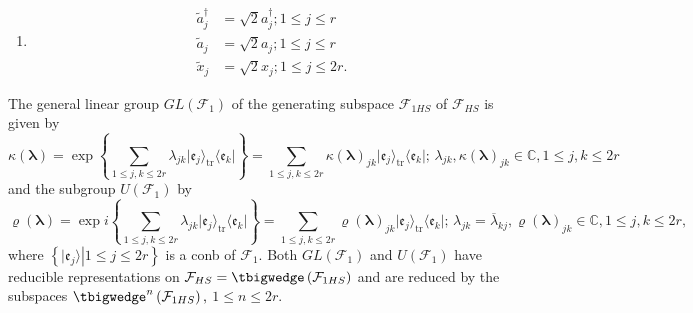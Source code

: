 \documentclass[aps, preprint]{revtex4}
\begin{document}
\begin{enumerate}
\item
\begin{align}\widetilde{a}_{j}^{ \dag } &  =\sqrt{2} a_{j}^{ \dag } ;1 \leq j \leq r \\
\widetilde{a}_{j} &  =\sqrt{2} a_{j} ;1 \leq j \leq r \\
\widetilde{x}_{j} &  =\sqrt{2} x_{j} ;1 \leq j \leq 2 r\text{.}\end{align}\end{enumerate}


The general linear group $G L \left (\mathcal{F}_{1}\right )$ of the generating subspace $\mathcal{F}_{1 H S}$ of $\mathcal{F}_{H S}$ is given by
\begin{equation}\kappa  \left (\mathbf{\lambda }\right ) =\exp  \left \{\sum _{1 \leq j ,k \leq 2 r}\lambda _{j k} \vert \mathfrak{e}_{j} \rangle _{\ensuremath{\operatorname*{tr}}} \langle \mathfrak{e}_{k}\vert \right \} =\sum _{1 \leq j ,k \leq 2 r}\kappa  \left (\mathbf{\lambda }\right )_{j k} \vert \mathfrak{e}_{j} \rangle _{\ensuremath{\operatorname*{tr}}} \langle \mathfrak{e}_{k}\vert  ;\,\lambda _{j k} ,\kappa  \left (\mathbf{\lambda }\right )_{j k} \in \mathbb{C} ,1 \leq j ,k \leq 2 r
\end{equation}and the subgroup $U \left (\mathcal{F}_{1}\right )$ by
\begin{equation}\varrho  \left (\mathbf{\lambda }\right ) =\exp i \left \{\sum _{1 \leq j ,k \leq 2 r}\lambda _{j k} \vert \mathfrak{e}_{j} \rangle _{\ensuremath{\operatorname*{tr}}} \langle \mathfrak{e}_{k}\vert \right \} =\sum _{1 \leq j ,k \leq 2 r}\varrho  \left (\mathbf{\lambda }\right )_{j k} \vert \mathfrak{e}_{j} \rangle _{\ensuremath{\operatorname*{tr}}} \langle \mathfrak{e}_{k}\vert  ;\,\lambda _{j k} =\overline{\lambda }_{k j} ,\varrho  \left (\mathbf{\lambda }\right )_{j k} \in \mathbb{C} ,1 \leq j ,k \leq 2 r\text{,}
\end{equation}where $\left \{\left .\vert \mathfrak{e}_{j} \rangle \right \vert 1 \leq j \leq 2 r\right \}$ is a conb of $\mathcal{F}_{1}\text{.}$ Both $G L \left (\mathcal{F}_{1}\right )$ and $U \left (\mathcal{F}_{1}\right )$ have reducible representations on $\mathcal{F}_{H S} = \tbigwedge \left (\mathcal{F}_{1 H S}\right )$ and are reduced by the subspaces $ \tbigwedge ^{n}\left (\mathcal{F}_{1 H S}\right )\text{,}$ $1 \leq n \leq 2 r$. 
\end{document}
